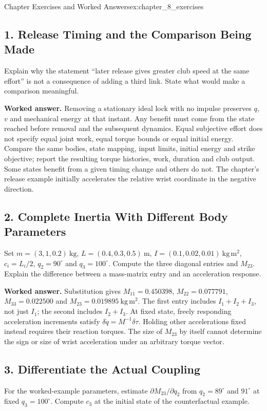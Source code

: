 \begin{exercises}{Chapter Exercises and Worked Answers}{ex:chapter_8_exercises}
\subsection*{1. Release Timing and the Comparison Being Made}
Explain why the statement ``later release gives greater club speed at the same effort'' is not a consequence of adding a third link. State what would make a comparison meaningful.

\textbf{Worked answer.} Removing a stationary ideal lock with no impulse preserves $q$, $v$ and mechanical energy at that instant. Any benefit must come from the state reached before removal and the subsequent dynamics. Equal subjective effort does not specify equal joint work, equal torque bounds or equal initial energy. Compare the same bodies, state mapping, input limits, initial energy and strike objective; report the resulting torque histories, work, duration and club output. Some states benefit from a given timing change and others do not. The chapter's release example initially accelerates the relative wrist coordinate in the negative direction.

\subsection*{2. Complete Inertia With Different Body Parameters}
Set $m=(3,1,0.2)\ \mathrm{kg}$, $L=(0.4,0.3,0.5)\ \mathrm m$, $I=(0.1,0.02,0.01)\ \mathrm{kg\,m^2}$, $c_i=L_i/2$, $q_2=90^\circ$ and $q_3=100^\circ$. Compute the three diagonal entries and $M_{23}$. Explain the difference between a mass-matrix entry and an acceleration response.

\textbf{Worked answer.} Substitution gives $M_{11}=0.450398$, $M_{22}=0.077791$, $M_{33}=0.022500$ and $M_{23}=0.019895\ \mathrm{kg\,m^2}$. The first entry includes $I_1+I_2+I_3$, not just $I_1$; the second includes $I_2+I_3$. At fixed state, freely responding acceleration increments satisfy $\delta\ddot q=M^{-1}\delta\tau$. Holding other accelerations fixed instead requires their reaction torques. The size of $M_{23}$ by itself cannot determine the sign or size of wrist acceleration under an arbitrary torque vector.

\subsection*{3. Differentiate the Actual Coupling}
For the worked-example parameters, estimate $\partial M_{23}/\partial q_2$ from $q_2=89^\circ$ and $91^\circ$ at fixed $q_3=100^\circ$. Compute $c_3$ at the initial state of the counterfactual example.


\end{exercises}
